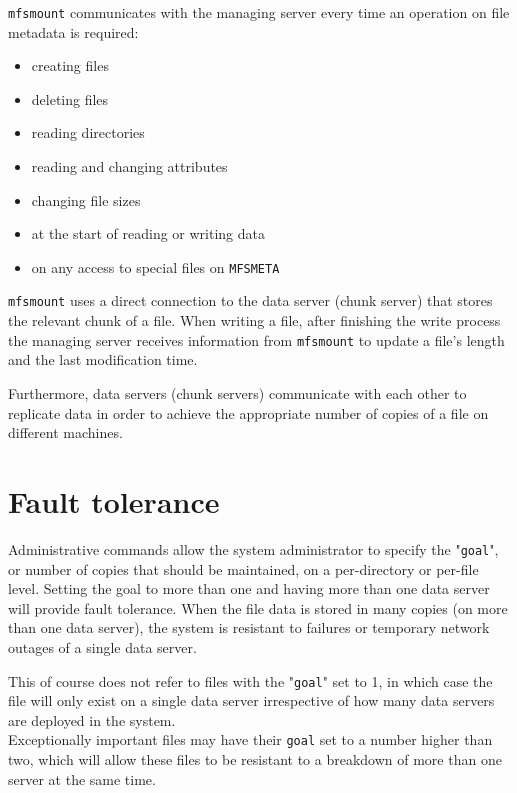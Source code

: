 \documentclass[a4paper,11pt,english]{report}
\def\code#1{\texttt{#1}}
\begin{document}
		\code{mfsmount} communicates with the managing server every time an operation on file metadata is required:
		\begin{itemize}
			\item creating files
			\item deleting files
			\item reading directories
			\item reading and changing attributes
			\item changing file sizes
			\item at the start of reading or writing data
			\item on any access to special files on \code{MFSMETA}
		\end{itemize}		

		\bigskip
		\code{mfsmount} uses a direct connection to the data server (chunk server) that stores the relevant chunk of a file. When writing a file, after finishing the write process the managing server receives information from \code{mfsmount} to update a file's length and the last modification time.
		
		Furthermore, data servers (chunk servers) communicate with each other to replicate data in order to achieve the appropriate number of copies of a file on different machines.
		
		\section{Fault tolerance}
		Administrative commands allow the system administrator to specify the "\code{goal}", or number of copies that should be maintained, on a per-directory or per-file level. Setting the goal to more than one and having more than one data server will provide fault tolerance. When the file data is stored in many copies (on more than one data server), the system is resistant to failures or temporary network outages of a single data server.
		
		This of course does not refer to files with the "\code{goal}" set to 1, in which case the file will only exist on a single data server irrespective of how many data servers are deployed in the system.\\
		
		Exceptionally important files may have their \code{goal} set to a number higher than two, which will allow these files to be resistant to a breakdown of more than one server at the same time.\\
		
\end{document}
